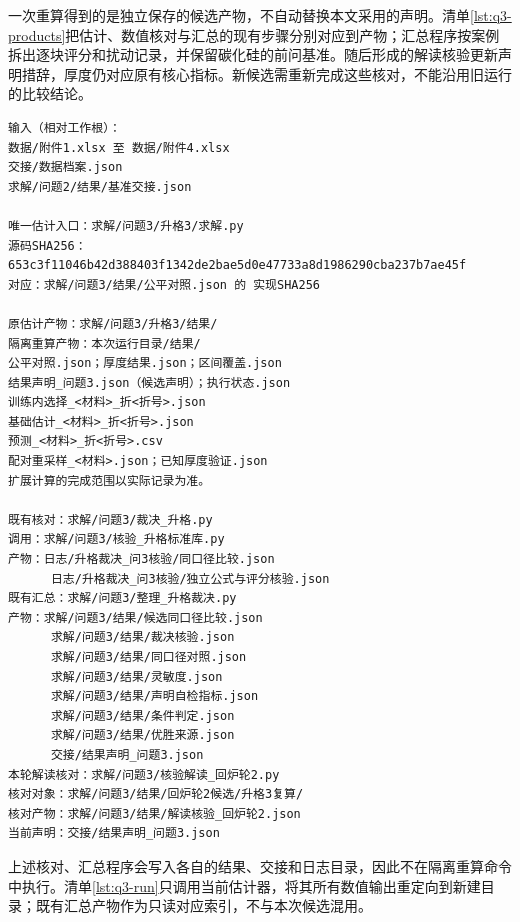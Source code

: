 一次重算得到的是独立保存的候选产物，不自动替换本文采用的声明。清单\ref{lst:q3-products}把估计、数值核对与汇总的现有步骤分别对应到产物；汇总程序按案例拆出逐块评分和扰动记录，并保留碳化硅的前问基准。随后形成的解读核验更新声明措辞，厚度仍对应原有核心指标。新候选需重新完成这些核对，不能沿用旧运行的比较结论。

\begingroup
\renewcommand{\lstlistingname}{清单}
\lstset{basicstyle=\ttfamily\footnotesize,columns=fullflexible,
  keepspaces=true,showstringspaces=false,breaklines=true,
  numbers=none,frame=single,captionpos=t}
\begin{lstlisting}[caption={第三问的输入与结果对应关系},label={lst:q3-products}]
输入（相对工作根）：
数据/附件1.xlsx 至 数据/附件4.xlsx
交接/数据档案.json
求解/问题2/结果/基准交接.json

唯一估计入口：求解/问题3/升格3/求解.py
源码SHA256：
653c3f11046b42d388403f1342de2bae5d0e47733a8d1986290cba237b7ae45f
对应：求解/问题3/结果/公平对照.json 的 实现SHA256

原估计产物：求解/问题3/升格3/结果/
隔离重算产物：本次运行目录/结果/
公平对照.json；厚度结果.json；区间覆盖.json
结果声明_问题3.json（候选声明）；执行状态.json
训练内选择_<材料>_折<折号>.json
基础估计_<材料>_折<折号>.json
预测_<材料>_折<折号>.csv
配对重采样_<材料>.json；已知厚度验证.json
扩展计算的完成范围以实际记录为准。

既有核对：求解/问题3/裁决_升格.py
调用：求解/问题3/核验_升格标准库.py
产物：日志/升格裁决_问3核验/同口径比较.json
      日志/升格裁决_问3核验/独立公式与评分核验.json
既有汇总：求解/问题3/整理_升格裁决.py
产物：求解/问题3/结果/候选同口径比较.json
      求解/问题3/结果/裁决核验.json
      求解/问题3/结果/同口径对照.json
      求解/问题3/结果/灵敏度.json
      求解/问题3/结果/声明自检指标.json
      求解/问题3/结果/条件判定.json
      求解/问题3/结果/优胜来源.json
      交接/结果声明_问题3.json
本轮解读核对：求解/问题3/核验解读_回炉轮2.py
核对对象：求解/问题3/结果/回炉轮2候选/升格3复算/
核对产物：求解/问题3/结果/解读核验_回炉轮2.json
当前声明：交接/结果声明_问题3.json
\end{lstlisting}
\endgroup

上述核对、汇总程序会写入各自的结果、交接和日志目录，因此不在隔离重算命令中执行。清单\ref{lst:q3-run}只调用当前估计器，将其所有数值输出重定向到新建目录；既有汇总产物作为只读对应索引，不与本次候选混用。

